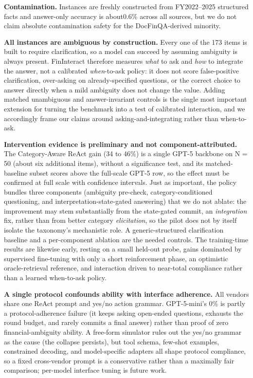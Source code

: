 \textbf{Contamination.}
Instances are freshly constructed from FY2022--2025 structured facts and
answer-only accuracy is about0.6\% across all sources, but we do not claim
absolute contamination safety for the DocFinQA-derived minority.

\textbf{All instances are ambiguous by construction.} Every one of the 173 items is built to
require clarification, so a model can succeed by assuming ambiguity is always present.
FinInteract therefore measures \emph{what} to ask and \emph{how} to integrate the answer, not a
calibrated \emph{when}-to-ask policy: it does not score false-positive clarification, over-asking
on already-specified questions, or the correct choice to answer directly when a mild ambiguity
does not change the value. Adding matched unambiguous and answer-invariant controls is the single
most important extension for turning the benchmark into a test of calibrated interaction, and we
accordingly frame our claims around asking-and-integrating rather than when-to-ask.

\textbf{Intervention evidence is preliminary and not component-attributed.} The Category-Aware
ReAct gain (34 to 46\%) is a single GPT-5 backbone on N = 50 (about six additional items),
without a significance test, and its matched-baseline subset scores above the full-scale GPT-5
row, so the effect must be confirmed at full scale with confidence intervals. Just as important,
the policy bundles three components (ambiguity pre-check, category-conditioned questioning, and
interpretation-state-gated answering) that we do not ablate: the improvement may stem
substantially from the state-gated commit, an \emph{integration} fix, rather than from better
category \emph{elicitation}, so the pilot does not by itself isolate the taxonomy's mechanistic
role. A generic-structured clarification baseline and a per-component ablation are the needed
controls. The training-time results are likewise early, resting on a small held-out probe, gains
dominated by supervised fine-tuning with only a short reinforcement phase, an optimistic
oracle-retrieval reference, and interaction driven to near-total compliance rather than a learned
when-to-ask policy.

\textbf{A single protocol confounds ability with interface adherence.} All vendors share one
ReAct prompt and yes/no action grammar. GPT-5-mini's 0\% is partly a protocol-adherence failure
(it keeps asking open-ended questions, exhausts the round budget, and rarely commits a final
answer) rather than proof of zero financial-ambiguity ability. A free-form simulator rules out
the yes/no grammar as the cause (the collapse persists), but tool schema, few-shot examples,
constrained decoding, and model-specific adapters all shape protocol compliance, so a fixed
cross-vendor prompt is a conservative rather than a maximally fair comparison; per-model interface
tuning is future work.

